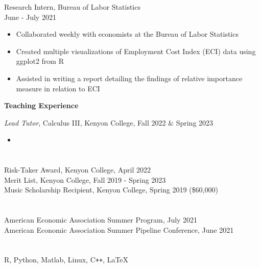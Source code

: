 \documentclass[margin, 11pt]{res} %
\begin{document}
\begin{resume}
Research Intern, Bureau of Labor Statistics \\
June - July 2021
	\begin{itemize}
		\item Collaborated weekly with economists at the Bureau of Labor Statistics
		\item Created multiple visualizations of Employment Cost Index (ECI) data using ggplot2 from R
		\item Assisted in writing a report detailing the findings of relative importance measure in relation to ECI
	\end{itemize}
\textbf{Teaching Experience}

	\emph{Lead Tutor},  Calculus III, Kenyon College, Fall 2022 \& Spring 2023
		\begin{itemize}
			\item 
		\end{itemize}



\section{}
Risk-Taker Award, Kenyon College, April 2022 \\
Merit List, Kenyon College, Fall 2019 - Spring 2023 \\
Music Scholarship Recipient, Kenyon College, Spring 2019 (\$60,000) 


\section{}
American Economic Association Summer Program, July 2021 \\
American Economic Association Summer Pipeline Conference, June 2021 \\



\section{}
R, Python, Matlab, Linux, C\texttt{++}, \LaTeX \\
 

\end{resume}
\end{document}
